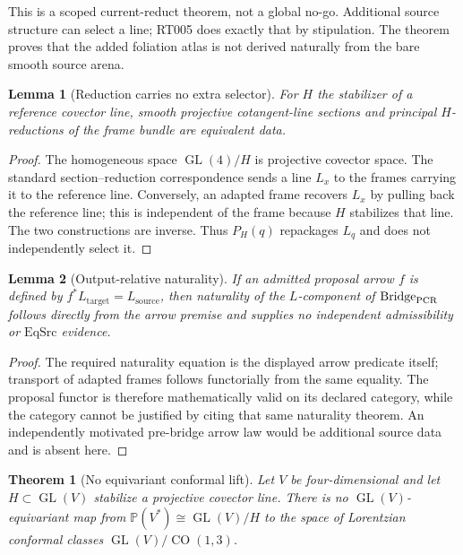 \documentclass[11pt]{article}
\newtheorem{theorem}{Theorem}
\newtheorem{lemma}{Lemma}
\newcommand{\GL}{\operatorname{GL}}
\newcommand{\CO}{\operatorname{CO}}
\begin{document}
This is a scoped current-reduct theorem, not a global no-go.  Additional
source structure can select a line; RT005 does exactly that by stipulation.
The theorem proves that the added foliation atlas is not derived naturally
from the bare smooth source arena.

\begin{lemma}[Reduction carries no extra selector]
For $H$ the stabilizer of a reference covector line, smooth projective
cotangent-line sections and principal $H$-reductions of the frame bundle are
equivalent data.
\end{lemma}

\begin{proof}
The homogeneous space $\GL(4)/H$ is projective covector space.  The standard
section--reduction correspondence sends a line $L_x$ to the frames carrying
it to the reference line.  Conversely, an adapted frame recovers $L_x$ by
pulling back the reference line; this is independent of the frame because
$H$ stabilizes that line.  The two constructions are inverse.  Thus
$P_H(q)$ repackages $L_q$ and does not independently select it.
\end{proof}

\begin{lemma}[Output-relative naturality]
If an admitted proposal arrow $f$ is defined by
$f^*L_{\mathrm{target}}=L_{\mathrm{source}}$, then naturality of the
$L$-component of $\mathrm{Bridge}_{\rm PCR}$ follows directly from the arrow
premise and supplies no independent admissibility or $\mathrm{EqSrc}$
evidence.
\end{lemma}

\begin{proof}
The required naturality equation is the displayed arrow predicate itself;
transport of adapted frames follows functorially from the same equality.
The proposal functor is therefore mathematically valid on its declared
category, while the category cannot be justified by citing that same
naturality theorem.  An independently motivated pre-bridge arrow law would
be additional source data and is absent here.
\end{proof}

\begin{theorem}[No equivariant conformal lift]
Let $V$ be four-dimensional and let $H\subset\GL(V)$ stabilize a projective
covector line.  There is no $\GL(V)$-equivariant map from
$\mathbb P(V^*)\cong\GL(V)/H$ to the space of Lorentzian conformal classes
$\GL(V)/\CO(1,3)$.
\end{theorem}
\end{document}

